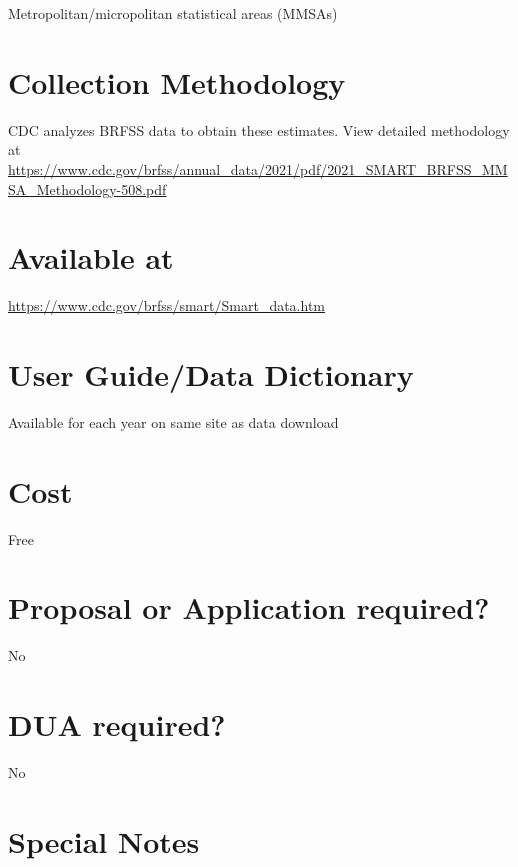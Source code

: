 \documentclass[
]{book}
\begin{document}
Metropolitan/micropolitan statistical areas (MMSAs)

\hypertarget{collection-methodology-78}{%
\section{Collection Methodology}\label{collection-methodology-78}}

CDC analyzes BRFSS data to obtain these estimates. View detailed methodology at \url{https://www.cdc.gov/brfss/annual_data/2021/pdf/2021_SMART_BRFSS_MMSA_Methodology-508.pdf}

\hypertarget{available-at-78}{%
\section{Available at}\label{available-at-78}}

\url{https://www.cdc.gov/brfss/smart/Smart_data.htm}

\hypertarget{user-guidedata-dictionary-78}{%
\section{User Guide/Data Dictionary}\label{user-guidedata-dictionary-78}}

Available for each year on same site as data download

\hypertarget{cost-78}{%
\section{Cost}\label{cost-78}}

Free

\hypertarget{proposal-or-application-required-78}{%
\section{Proposal or Application required?}\label{proposal-or-application-required-78}}

No

\hypertarget{dua-required-78}{%
\section{DUA required?}\label{dua-required-78}}

No

\hypertarget{special-notes-78}{%
\section{Special Notes}\label{special-notes-78}}
\end{document}
